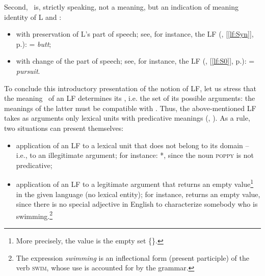 Second, \sigmaF\ is, strictly speaking, not a meaning, but an indication of meaning identity of L and :

\begin{itemize}

\item with preservation of L's part of speech; see, for instance, the LF  (, [\ref{lf:Syn}], p.\thinspace\pageref{lf:Syn}):  = \textit{butt};

\item with change of the part of speech; see, for instance, the LF  (, [\ref{lf:S0}], p.\thinspace\pageref{lf:S0}):  = \textit{pursuit}.

\end{itemize}

To conclude this introductory presentation of the notion of LF, let us stress that the meaning \sigmaF\ of an LF  determines its , i.e. the set of its possible arguments: the meanings of the latter must be compatible with \sigmaF. Thus, the above-mentioned LF  takes as arguments only lexical units with predicative meanings (, ). As a rule, two situations can present themselves:

\begin{itemize}

\item application of an LF to a lexical unit that does not belong to its domain -- i.e., to an illegitimate argument; for instance: *, since the noun \textsc{poppy} is not predicative;

\item application of an LF to a legitimate argument that returns an empty value\footnote{More precisely, the value is the empty set \{\thinspace\}.} in the given language (no lexical entity); for instance,  returns an empty value, since there is no special adjective in English to characterize somebody who is swimming.\footnote{The expression \textit{swimming} is an inflectional form (present participle) of the verb \textsc{swim}, whose use is accounted for by the grammar.}

\end{itemize}

